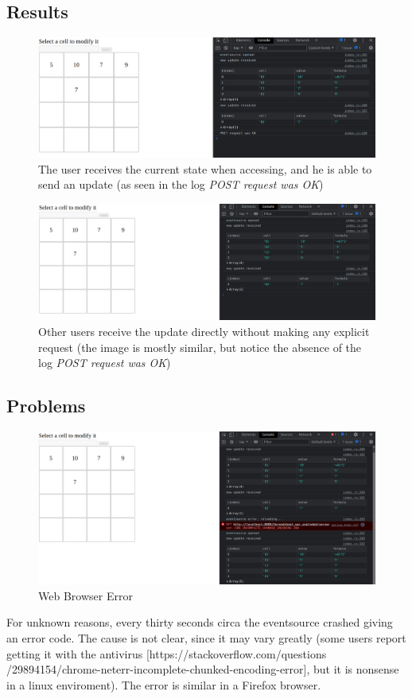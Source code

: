 \documentclass[12pt, a4paper]{article}
\begin{document}
  \subsection{Results}
  \begin{figure}[H]
    \centering
    \includegraphics[width=\columnwidth]{eventsource-POST.png}
    \caption{The user receives the current state when accessing, and he is able to send an update (as seen in the log \textit{POST request was OK})}
  \end{figure}
  \begin{figure}[H]
    \centering
    \includegraphics[width=\columnwidth]{eventsource-new-update.png}
    \caption{Other users receive the update directly without making any explicit request (the image is mostly similar, but notice the absence of the log \textit{POST request was OK})}
  \end{figure}

  \subsection{Problems}
  \begin{figure}[H]
    \centering
    \includegraphics[width=\columnwidth]{eventsource-chrome-error.png}
    \caption{Web Browser Error}
  \end{figure}
  For unknown reasons, every thirty seconds circa the eventsource crashed giving an error code. The cause is not clear, since it may vary greatly (some users report getting it with the antivirus [https://stackoverflow.com/questions\\/29894154/chrome-neterr-incomplete-chunked-encoding-error], but it is nonsense in a linux enviroment). The error is similar in a Firefox browser.
\end{document}
